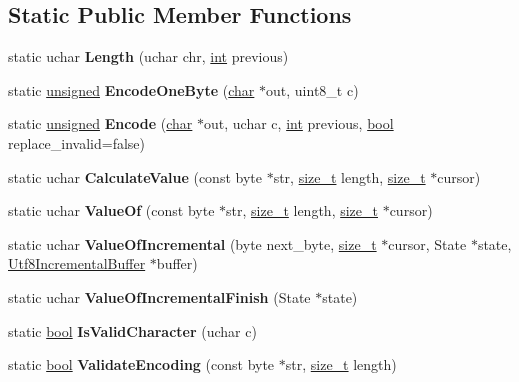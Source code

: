 \subsection*{Static Public Member Functions}
\begin{DoxyCompactItemize}
\item 
\mbox{\label{classunibrow_1_1Utf8_a5c6a30a8610649fee6dbb05057862113}} 
static uchar {\bfseries Length} (uchar chr, \mbox{\hyperlink{classint}{int}} previous)
\item 
\mbox{\label{classunibrow_1_1Utf8_a944c72d1ddbcccc8f6386f1ff971404f}} 
static \mbox{\hyperlink{classunsigned}{unsigned}} {\bfseries Encode\+One\+Byte} (\mbox{\hyperlink{classchar}{char}} $\ast$out, uint8\+\_\+t c)
\item 
\mbox{\label{classunibrow_1_1Utf8_acf0af099acd418650bf1a8080f14e926}} 
static \mbox{\hyperlink{classunsigned}{unsigned}} {\bfseries Encode} (\mbox{\hyperlink{classchar}{char}} $\ast$out, uchar c, \mbox{\hyperlink{classint}{int}} previous, \mbox{\hyperlink{classbool}{bool}} replace\+\_\+invalid=false)
\item 
\mbox{\label{classunibrow_1_1Utf8_a7c355e692f5abdea8fcf4aff60adb728}} 
static uchar {\bfseries Calculate\+Value} (const byte $\ast$str, \mbox{\hyperlink{classsize__t}{size\+\_\+t}} length, \mbox{\hyperlink{classsize__t}{size\+\_\+t}} $\ast$cursor)
\item 
\mbox{\label{classunibrow_1_1Utf8_a694bc73a14569ce19c6baa4b6caf1c99}} 
static uchar {\bfseries Value\+Of} (const byte $\ast$str, \mbox{\hyperlink{classsize__t}{size\+\_\+t}} length, \mbox{\hyperlink{classsize__t}{size\+\_\+t}} $\ast$cursor)
\item 
\mbox{\label{classunibrow_1_1Utf8_a12ac713077078c62e66045b12541db34}} 
static uchar {\bfseries Value\+Of\+Incremental} (byte next\+\_\+byte, \mbox{\hyperlink{classsize__t}{size\+\_\+t}} $\ast$cursor, State $\ast$state, \mbox{\hyperlink{classuint32__t}{Utf8\+Incremental\+Buffer}} $\ast$buffer)
\item 
\mbox{\label{classunibrow_1_1Utf8_a9f49ab6b7b4901df03abeb74dd431434}} 
static uchar {\bfseries Value\+Of\+Incremental\+Finish} (State $\ast$state)
\item 
\mbox{\label{classunibrow_1_1Utf8_a952ffb9c81612f5b5c22b11da54e058e}} 
static \mbox{\hyperlink{classbool}{bool}} {\bfseries Is\+Valid\+Character} (uchar c)
\item 
\mbox{\label{classunibrow_1_1Utf8_a643137ed153ce44d06fe365ce3075594}} 
static \mbox{\hyperlink{classbool}{bool}} {\bfseries Validate\+Encoding} (const byte $\ast$str, \mbox{\hyperlink{classsize__t}{size\+\_\+t}} length)
\end{DoxyCompactItemize}
